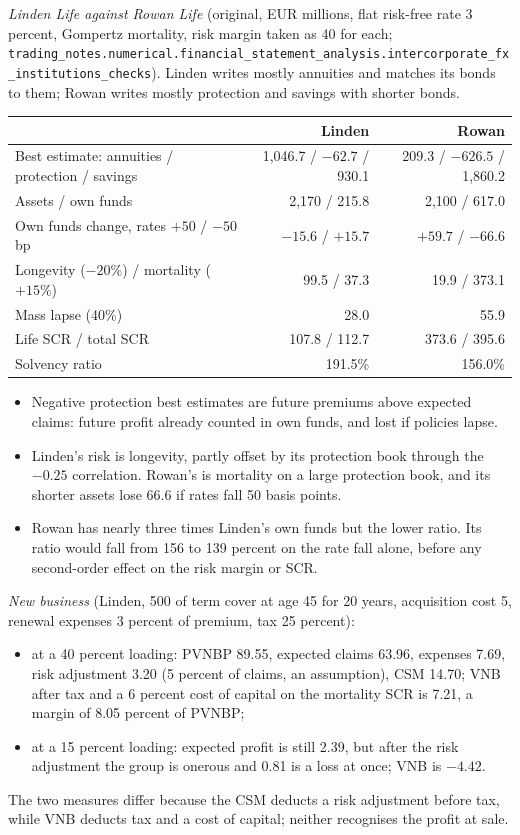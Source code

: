 \begin{qfmethod}
 \emph{Linden Life against Rowan Life} (original, EUR millions, flat risk-free rate 3 percent, Gompertz mortality, risk margin taken as 40 for each; \nolinkurl{trading_notes.numerical.financial_statement_analysis.intercorporate_fx_institutions_checks}). Linden writes mostly annuities and matches its bonds to them; Rowan writes mostly protection and savings with shorter bonds.
\begin{center}\small
\begin{tabular}{@{}lrr@{}}
\toprule
 & Linden & Rowan \\
\midrule
Best estimate: annuities / protection / savings & 1,046.7 / $-62.7$ / 930.1 & 209.3 / $-626.5$ / 1,860.2 \\
Assets / own funds & 2,170 / 215.8 & 2,100 / 617.0 \\
Own funds change, rates $+50$ / $-50$ bp & $-15.6$ / $+15.7$ & $+59.7$ / $-66.6$ \\
Longevity ($-20\%$) / mortality ($+15\%$) & 99.5 / 37.3 & 19.9 / 373.1 \\
Mass lapse (40\%) & 28.0 & 55.9 \\
Life SCR / total SCR & 107.8 / 112.7 & 373.6 / 395.6 \\
Solvency ratio & 191.5\% & 156.0\% \\
\bottomrule
\end{tabular}
\end{center}
\begin{itemize}
\item Negative protection best estimates are future premiums above expected claims: future profit already counted in own funds, and lost if policies lapse.
\item Linden's risk is longevity, partly offset by its protection book through the $-0.25$ correlation. Rowan's is mortality on a large protection book, and its shorter assets lose 66.6 if rates fall 50 basis points.
\item Rowan has nearly three times Linden's own funds but the lower ratio. Its ratio would fall from 156 to 139 percent on the rate fall alone, before any second-order effect on the risk margin or SCR.
\end{itemize}

\emph{New business} (Linden, 500 of term cover at age 45 for 20 years, acquisition cost 5, renewal expenses 3 percent of premium, tax 25 percent):
\begin{itemize}
\item at a 40 percent loading: PVNBP 89.55, expected claims 63.96, expenses 7.69, risk adjustment 3.20 (5 percent of claims, an assumption), CSM 14.70; VNB after tax and a 6 percent cost of capital on the mortality SCR is 7.21, a margin of 8.05 percent of PVNBP;
\item at a 15 percent loading: expected profit is still 2.39, but after the risk adjustment the group is onerous and 0.81 is a loss at once; VNB is $-4.42$.
\end{itemize}
The two measures differ because the CSM deducts a risk adjustment before tax, while VNB deducts tax and a cost of capital; neither recognises the profit at sale.


\end{qfmethod}
